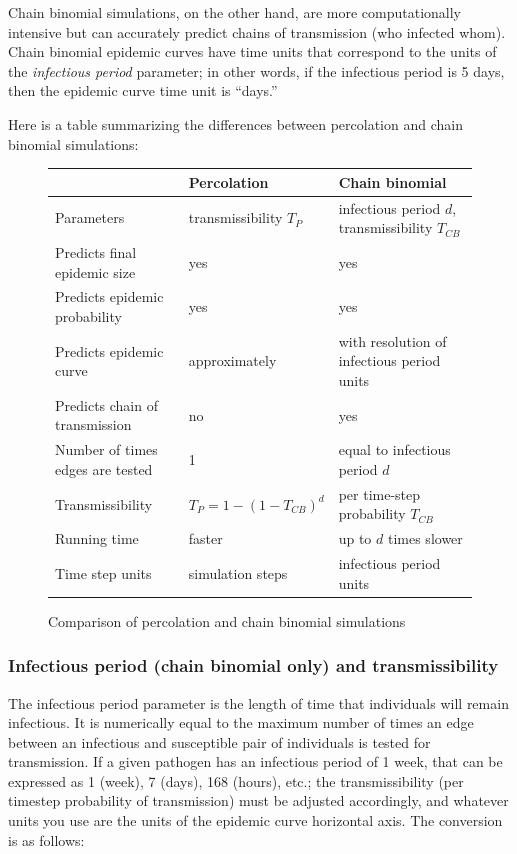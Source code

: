 \documentclass{article}
\begin{document}
Chain binomial simulations, on the other hand, are more computationally intensive but can accurately predict chains of transmission (who infected whom).  Chain binomial epidemic curves have time units that correspond to the units of the \textit{infectious period} parameter; in other words, if the infectious period is 5 days, then the epidemic curve time unit is ``days.''

\pagebreak
Here is a table summarizing the differences between percolation and chain binomial simulations:

\UndefineShortVerb{\|}
\begin{figure}[h]
\begin{center}
\begin{tabular}{|l|l|l|}
\hline
& Percolation & Chain binomial \\ \hline
Parameters & transmissibility $T_{P}$ & infectious period $d$, transmissibility $T_{CB}$\\
Predicts final epidemic size & yes & yes\\ 
Predicts epidemic probability & yes & yes\\ 
Predicts epidemic curve & approximately & with resolution of infectious period units\\
Predicts chain of transmission & no & yes\\
Number of times edges are tested & 1 & equal to infectious period $d$\\ 
Transmissibility & $T_{P} = 1 - (1-T_{CB})^d$ & per time-step probability $T_{CB}$\\ 
Running time & faster & up to $d$ times slower\\ 
Time step units & simulation steps & infectious period units \\
\hline
\end{tabular}
\caption{Comparison of percolation and chain binomial simulations}
\end{center}
\end{figure}
\DefineShortVerb{\|}

\subsubsection{Infectious period (chain binomial only) and transmissibility}
The infectious period parameter is the length of time that individuals will remain infectious.  It is numerically equal to the maximum number of times an edge between an infectious and susceptible pair of individuals is tested for transmission.  If a given pathogen has an infectious period of 1 week, that can be expressed as 1 (week), 7 (days), 168 (hours), etc.; the transmissibility (per time\textendash step probability of transmission) must be adjusted accordingly, and whatever units you use are the units of the epidemic curve horizontal axis.  The conversion is as follows:
\end{document}
